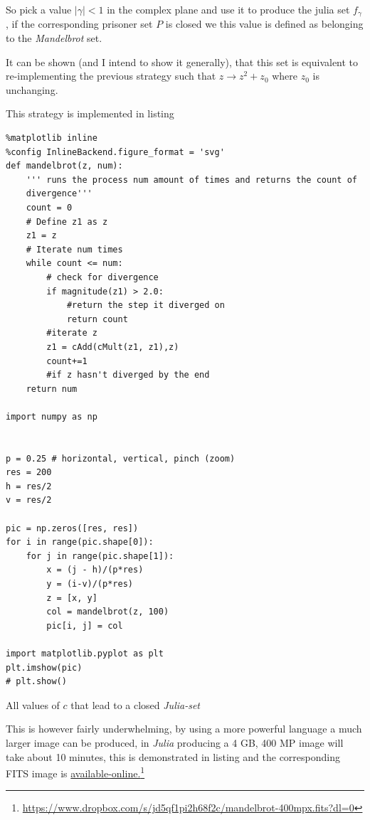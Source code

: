 \documentclass[11pt]{article}
\begin{document}
So pick a value \(\left\lvert \gamma \right \rvert < 1\) in the complex plane and
use it to produce the julia set \(f_{\gamma}\), if the corresponding prisoner set
\(P\) is closed we this value is defined as belonging to the \emph{Mandelbrot} set.

It can be shown (and I intend to show it generally), that this set is equivalent to re-implementing the previous strategy such that \(z \rightarrow z^{2} + z_{0}\) where \(z_{0}\) is unchanging.

This strategy is implemented in listing 

\begin{listing}[htbp]
\begin{verbatim}
%matplotlib inline
%config InlineBackend.figure_format = 'svg'
def mandelbrot(z, num):
    ''' runs the process num amount of times and returns the count of
    divergence'''
    count = 0
    # Define z1 as z
    z1 = z
    # Iterate num times
    while count <= num:
        # check for divergence
        if magnitude(z1) > 2.0:
            #return the step it diverged on
            return count
        #iterate z
        z1 = cAdd(cMult(z1, z1),z)
        count+=1
        #if z hasn't diverged by the end
    return num

import numpy as np


p = 0.25 # horizontal, vertical, pinch (zoom)
res = 200
h = res/2
v = res/2

pic = np.zeros([res, res])
for i in range(pic.shape[0]):
    for j in range(pic.shape[1]):
        x = (j - h)/(p*res)
        y = (i-v)/(p*res)
        z = [x, y]
        col = mandelbrot(z, 100)
        pic[i, j] = col

import matplotlib.pyplot as plt
plt.imshow(pic)
# plt.show()
\end{verbatim}
\caption{\label{py-mandelbrot-code}All values of \(c\) that lead to a closed \emph{Julia-set}}
\end{listing}

\begin{center}

\end{center}

This is however fairly underwhelming, by using a more powerful language a much
larger image can be produced, in \emph{Julia} producing a 4 GB, 400 MP image will
take about 10 minutes, this is demonstrated in listing 
and the corresponding FITS image is \href{https://www.dropbox.com/s/jd5qf1pi2h68f2c/mandelbrot-400mpx.fits?dl=0}{available-online.}\footnote{\href{https://www.dropbox.com/s/jd5qf1pi2h68f2c/mandelbrot-400mpx.fits?dl=0}{https://www.dropbox.com/s/jd5qf1pi2h68f2c/mandelbrot-400mpx.fits?dl=0}}
\end{document}
